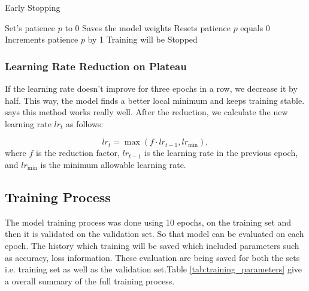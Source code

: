\documentclass[12pt,onecolumn]{report}
\begin{document}
\begin{algorithm}[h]
\caption{Early Stopping}
\label{alg:early_stopping}
\begin{algorithmic}[1]
\State Set's patience \( p \) to 0
        \State Saves the model weights
        \State Resets patience \( p \) equals 0
    \Else
        \State Increments patience \( p \) by 1
    \EndIf
        \State Training will be Stopped
    \EndIf
\EndFor
\end{algorithmic}
\end{algorithm}

\subsubsection{Learning Rate Reduction on Plateau}
If the learning rate doesn’t improve for three epochs in a row, we decrease it by half. This way, the model finds a better local minimum and keeps training stable. \cite{2017Loshchilov} says this method works really well. After the reduction, we calculate the new learning rate \(lr_t\) as follows:

\begin{equation}
    lr_t = \max(f \cdot lr_{t-1}, lr_{\text{min}}),
\end{equation}
where \(f\) is the reduction factor, \(lr_{t-1}\) is the learning rate in the previous epoch, and \(lr_{\text{min}}\) is the minimum allowable learning rate.

\subsection{Training Process}
The model training process was done using 10 epochs, on the training set and then it is validated on the validation set. So that model can be evaluated on each epoch. The history which training will be saved which included parameters such as accuracy, loss information. These evaluation are being saved for both the sets i.e. training set as well as the validation set.Table \ref{tab:training_parameters} give a overall summary of the full training process.
\end{document}
